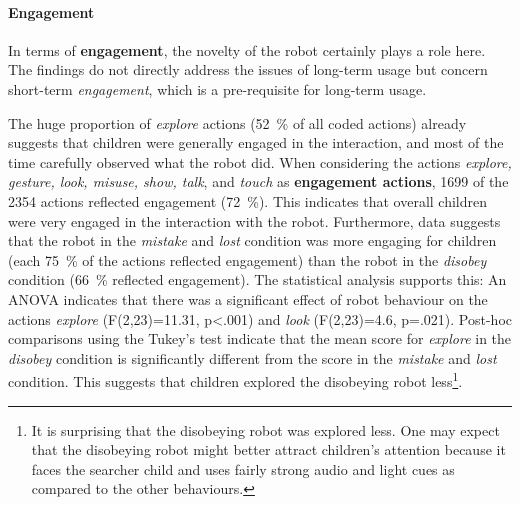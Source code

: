 \documentclass{sig-alternate}
\begin{document}


\paragraph{Engagement}
In terms of \textbf{engagement}, the novelty of the robot certainly plays a role
here. The findings do not directly address the issues
of long-term usage but concern short-term \textit{engagement}, which is a
pre-requisite for long-term usage.


The huge proportion of \textit{explore} actions (52~\% of all coded actions)
already suggests that children were generally engaged in the interaction, and
most of the time carefully observed what the robot did. When considering the
actions \textit{explore, gesture, look, misuse, show, talk}, and \textit{touch}
as \textbf{engagement actions}, 1699 of the 2354 actions reflected engagement
(72~\%). This indicates that overall children were very engaged in the
interaction with the robot. Furthermore, data suggests that the robot in the
\textit{mistake} and \textit{lost} condition was more engaging for children
(each 75~\% of the actions reflected engagement) than the robot in the
\textit{disobey} condition (66~\% reflected engagement). The statistical
analysis supports this: An ANOVA indicates that there was a significant effect
of robot behaviour on the actions \textit{explore} (F(2,23)=11.31, p<.001) and
\textit{look} (F(2,23)=4.6, p=.021). Post-hoc comparisons using the Tukey's test
indicate that the mean score for \textit{explore} in the \textit{disobey}
condition is significantly different from the score in the \textit{mistake} and
\textit{lost} condition. This suggests that children explored the disobeying
robot less\footnote{It is surprising that the disobeying robot was explored
less. One may expect that the disobeying robot might better attract
children's attention because it faces the searcher child and uses fairly
strong audio and light cues as compared to the other behaviours.}. 
\end{document}
